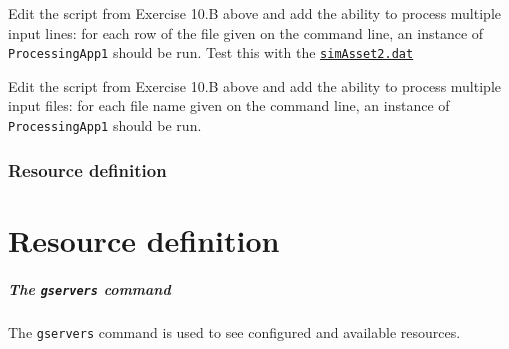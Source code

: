 \documentclass[english,serif,mathserif,xcolor=pdftex,dvipsnames,table]{beamer}
\begin{document}
\begin{frame}[fragile]
  \small

  \begin{exercise*}[10.D]

    Edit the script from Exercise 10.B above and add the ability to process
    multiple input lines: for each row of the file given on the command line, an
    instance of \texttt{ProcessingApp1} should be run. Test this with the
    \href{https://raw.githubusercontent.com/riccardomurri/python-for-science-intro/master/fig/simAsset2.dat}{\texttt{simAsset2.dat}}
  \end{exercise*}

  \+
  \begin{exercise*}[10.E]
    Edit the script from Exercise 10.B above and add the ability to
    process multiple input files: for each file name given on the command
    line, an instance of \texttt{ProcessingApp1} should be run.
  \end{exercise*}
\end{frame}


\section{Resource definition}
\part{Resource definition}

\begin{frame}[fragile]
  \frametitle{The \texttt{gservers} command}

  The \texttt{gservers} command is used to see \alert<2>{configured} and
  available resources.

\+

\end{frame}
\end{document}
